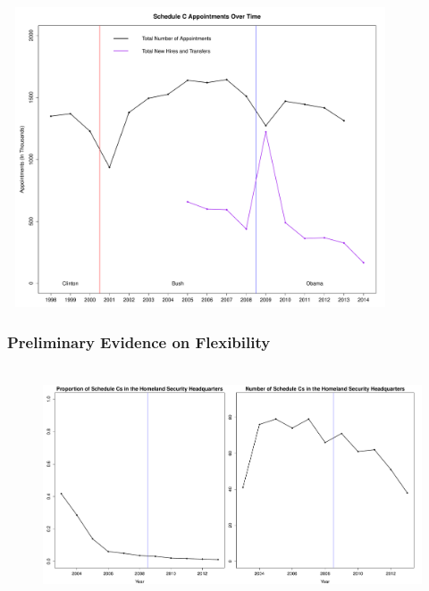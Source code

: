 \documentclass{beamer}
\begin{document}
\begin{frame}
\begin{center}
\includegraphics[height=3.5in,width=4.5in]{SCAptsandAccOverTime.pdf}
\end{center}
\end{frame}

\begin{frame}
\frametitle{Preliminary Evidence on Flexibility}
\begin{figure}[htb]
\begin{center}
\includegraphics[height=2.75in,width=4.9in]{DHSProportionRawNumber.pdf}
\end{center}
\end{figure}
\end{frame}
\end{document}
